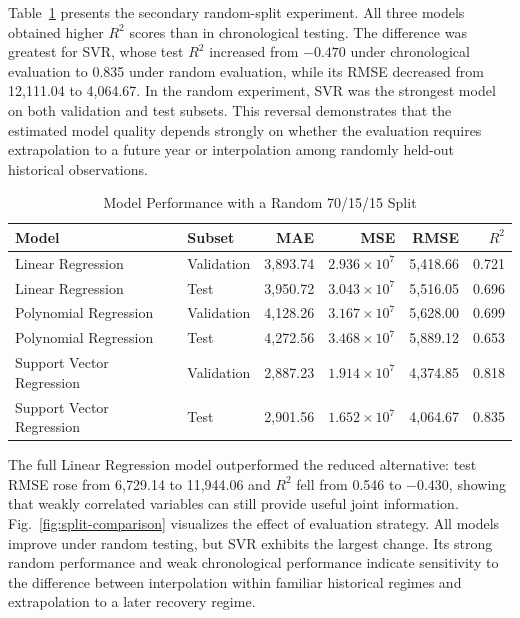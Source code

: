 \documentclass[conference,a4paper]{IEEEtran}
\begin{document}
Table~\ref{tab:random-performance} presents the secondary random-split experiment. All three models obtained higher $R^2$ scores than in chronological testing. The difference was greatest for SVR, whose test $R^2$ increased from $-0.470$ under chronological evaluation to 0.835 under random evaluation, while its RMSE decreased from 12,111.04 to 4,064.67. In the random experiment, SVR was the strongest model on both validation and test subsets. This reversal demonstrates that the estimated model quality depends strongly on whether the evaluation requires extrapolation to a future year or interpolation among randomly held-out historical observations.

\begin{table}[htbp]
\caption{Model Performance with a Random 70/15/15 Split}
\label{tab:random-performance}
\centering
\begin{tabular}{llrrrr}
\toprule
\textbf{Model} & \textbf{Subset} & \textbf{MAE} & \textbf{MSE} & \textbf{RMSE} & \textbf{$R^2$} \\
\midrule
Linear Regression & Validation & 3,893.74 & $2.936\times10^7$ & 5,418.66 & 0.721 \\
Linear Regression & Test & 3,950.72 & $3.043\times10^7$ & 5,516.05 & 0.696 \\
Polynomial Regression & Validation & 4,128.26 & $3.167\times10^7$ & 5,628.00 & 0.699 \\
Polynomial Regression & Test & 4,272.56 & $3.468\times10^7$ & 5,889.12 & 0.653 \\
Support Vector Regression & Validation & 2,887.23 & $1.914\times10^7$ & 4,374.85 & 0.818 \\
Support Vector Regression & Test & 2,901.56 & $1.652\times10^7$ & 4,064.67 & 0.835 \\
\bottomrule
\end{tabular}
\end{table}

The full Linear Regression model outperformed the reduced alternative: test RMSE rose from 6,729.14 to 11,944.06 and $R^2$ fell from 0.546 to $-0.430$, showing that weakly correlated variables can still provide useful joint information.
Fig.~\ref{fig:split-comparison} visualizes the effect of evaluation strategy. All models improve under random testing, but SVR exhibits the largest change. Its strong random performance and weak chronological performance indicate sensitivity to the difference between interpolation within familiar historical regimes and extrapolation to a later recovery regime.
\end{document}
